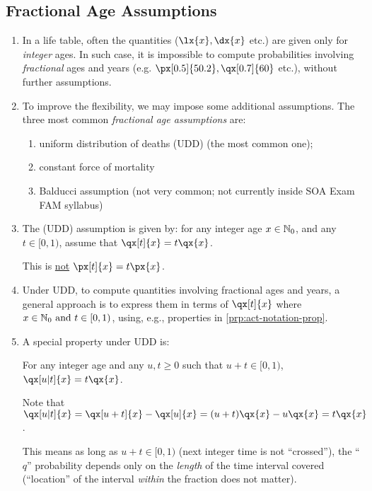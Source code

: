 \subsection{Fractional Age Assumptions}
\begin{enumerate}
\item In a life table, often the quantities (\(\lx{x},\dx{x}\) etc.) are given
only for \emph{integer} ages. In such case, it is impossible to compute probabilities
involving \emph{fractional} ages and years (e.g. \(\px[0.5]{50.2},
\qx[0.7]{60}\) etc.), without further assumptions.
\item To improve the flexibility, we may impose some additional assumptions.
The three most common \emph{fractional age assumptions} are: \begin{enumerate}
\item uniform distribution of deaths (UDD) (the most common one);
\item constant force of mortality
\item Balducci assumption (not very common; not currently inside SOA Exam FAM
syllabus)
\end{enumerate}

\item The  (UDD) assumption is given by: for
any integer age \(x\in\mathbb{N}_0\), and any \(t\in[0,1)\), assume that
\(\qx[t]{x}=t\qx{x}\).
\begin{warning}
This is \underline{not} \(\px[t]{x}=t\px{x}\).
\end{warning}
\item \label{it:udd-approach} Under UDD, to compute quantities involving fractional ages and years,
a general approach is to express them in terms of \(\qx[t]{x}\) where
\(x\in\mathbb{N}_0\text{ and }t\in[0,1)\), using, e.g., properties in \cref{prp:act-notation-prop}.
\item A special property under UDD is:
\begin{proposition}
\label{prp:udd-only-length}
For any integer age and any \(u,t\ge 0\) such that \(u+t\in[0,1)\),
\(\qx[u|t]{x}=t\qx{x}\).
\end{proposition}

\begin{pf}
Note that \(\qx[u|t]{x}=\qx[u+t]{x}-\qx[u]{x}=(u+t)\qx{x}-u\qx{x}=t\qx{x}\).
\end{pf}

\begin{note}
This means as long as \(u+t\in[0,1)\) (next integer time is not ``crossed''),
the ``\(q\)'' probability depends only on the \emph{length} of the time interval
covered (``location'' of the interval \emph{within} the fraction does not
matter).
\end{note}


\end{enumerate}

